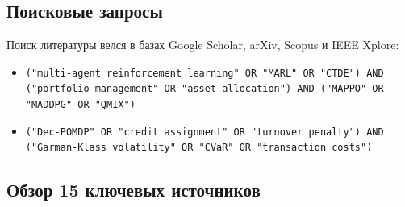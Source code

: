 \documentclass[11pt,a4paper]{article}
\begin{document}
\subsection{Поисковые запросы}

Поиск литературы велся в базах Google Scholar, arXiv, Scopus и IEEE Xplore:
\begin{itemize}[leftmargin=*]
\item \texttt{("multi-agent reinforcement learning" OR "MARL" OR "CTDE") AND}\\
\texttt{("portfolio management" OR "asset allocation") AND ("MAPPO" OR "MADDPG" OR "QMIX")}
\item \texttt{("Dec-POMDP" OR "credit assignment" OR "turnover penalty") AND}\\
\texttt{("Garman-Klass volatility" OR "CVaR" OR "transaction costs")}
\end{itemize}

\subsection{Обзор 15 ключевых источников}
\end{document}
